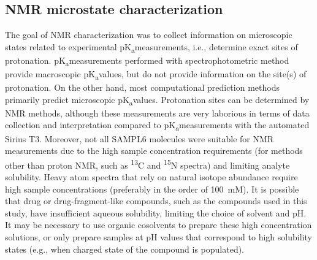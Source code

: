 \documentclass[9pt,lineno]{elife}
\newcommand{\pKa}{pK\textsubscript{a}}
\begin{document}
\subsection{NMR microstate characterization}

The goal of NMR characterization was to collect information on microscopic states related to experimental \pKa measurements, i.e., determine exact sites of protonation. 
\pKa measurements performed with spectrophotometric method provide macroscopic \pKa values, but do not provide information on the site(s) of protonation. 
On the other hand, most computational prediction methods primarily predict microscopic \pKa values. 
Protonation sites can be determined by NMR methods, although these measurements are very laborious in terms of data collection and interpretation compared to \pKa measurements with the automated Sirius T3. 
Moreover, not all SAMPL6 molecules were suitable for NMR measurements due to the high sample concentration requirements (for methods other than proton NMR, such as \textsuperscript{13}C and \textsuperscript{15}N spectra) and limiting analyte solubility. 
Heavy atom spectra that rely on natural isotope abundance require high sample concentrations (preferably in the order of 100~mM). It is possible that drug or drug-fragment-like compounds, such as the compounds used in this study, have insufficient aqueous solubility, limiting the choice of solvent and pH. 
It may be necessary to use organic cosolvents to prepare these high concentration solutions, or only prepare samples at pH values that correspond to high solubility states (e.g., when charged state of the compound is populated). 
\end{document}
